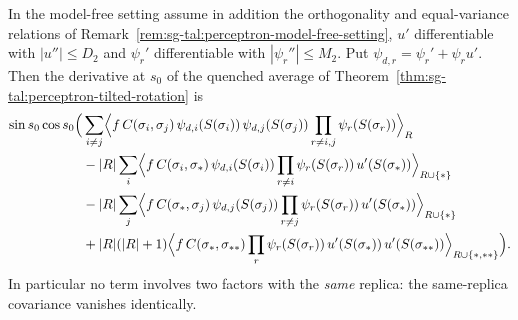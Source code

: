 \begin{theorem}\label{thm:sg-tal:perceptron-tilted-rotation-ibp}
  \leanok
In the model-free setting assume in addition the orthogonality and equal-variance relations of Remark~\ref{rem:sg-tal:perceptron-model-free-setting}, $u'$ differentiable with $|u''|\le D_2$ and $\psi_r'$ differentiable with $|\psi_r''|\le M_2$. Put $\psi_{d,r}=\psi_r'+\psi_ru'$.
Then the derivative at $s_0$ of the quenched average of Theorem~\ref{thm:sg-tal:perceptron-tilted-rotation} is
\begin{align*}
 \sin s_0\cos s_0\Bigl(&\sum_{i\ne j}\Bigl\langle f\,C(\sigma_i,\sigma_j)\,\psi_{d,i}(S(\sigma_i))\,\psi_{d,j}(S(\sigma_j))\prod_{r\ne i,j}\psi_r(S(\sigma_r))\Bigr\rangle_{R}\\
 &-|R|\sum_{i}\Bigl\langle f\,C(\sigma_i,\sigma_*)\,\psi_{d,i}(S(\sigma_i))\prod_{r\ne i}\psi_r(S(\sigma_r))\,u'(S(\sigma_*))\Bigr\rangle_{R\cup\{*\}}\\
 &-|R|\sum_{j}\Bigl\langle f\,C(\sigma_*,\sigma_j)\,\psi_{d,j}(S(\sigma_j))\prod_{r\ne j}\psi_r(S(\sigma_r))\,u'(S(\sigma_*))\Bigr\rangle_{R\cup\{*\}}\\
 &+|R|(|R|+1)\Bigl\langle f\,C(\sigma_*,\sigma_{**})\prod_r\psi_r(S(\sigma_r))\,u'(S(\sigma_*))\,u'(S(\sigma_{**}))\Bigr\rangle_{R\cup\{*,**\}}\Bigr).
\end{align*}
In particular no term involves two factors with the \emph{same} replica: the same-replica covariance vanishes identically.
\end{theorem}

